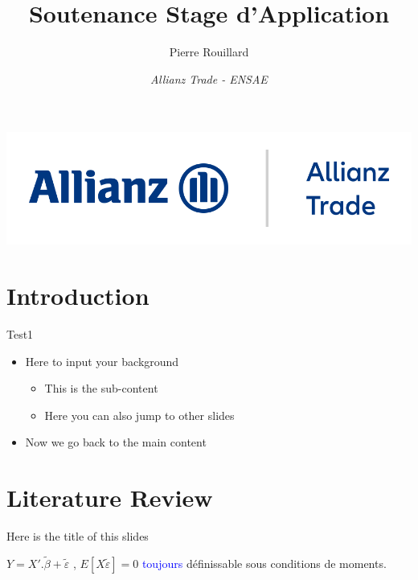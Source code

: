 \documentclass[9pt, xcolor={dvipsnames}]{beamer}
\author{Pierre Rouillard}
\title{Soutenance Stage d'Application}
\institute{xx/xx/xxxx}
\date{\textit{Allianz Trade - ENSAE}}
\newcommand{\blue}[1]{\textcolor{blue}{#1}}
\begin{document}
\begin{frame}[plain]
\titlepage
\centering
\includegraphics[width=.5\textwidth]{Allianz_Trade.png}
\end{frame}

\section{Introduction}
\begin{frame}[label=Background]{Test1}
\begin{itemize}
\item Here to input your background\\
   \begin{itemize}
    \item This is the sub-content
    \item Here you can also jump to other slides \hyperlink{Rocky}{\beamergotobutton{}}
   \end{itemize}
\item Now we go back to the main content\\

\end{itemize}
\end{frame}

\section{Literature Review}
\begin{frame}{Here is the title of this slides}
\begin{boxH}
    $Y = X'.\widetilde{\beta} + \widetilde{\varepsilon}$ , $E[X\widetilde{\varepsilon}]=0$ \blue{toujours} définissable sous conditions de moments.
\end{boxH}
\end{frame}
\end{document}
